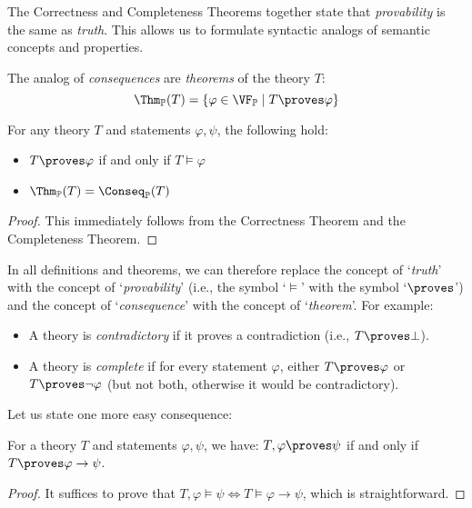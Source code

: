 The Correctness and Completeness Theorems together state that \emph{provability} is the same as \emph{truth}. This allows us to formulate syntactic analogs of semantic concepts and properties.

The analog of \emph{consequences} are \emph{theorems} of the theory $T$:
$$
\Thm_\mathbb{P}(T) = \{\varphi \in \VF_\mathbb{P} \mid T \proves \varphi\}
$$

\begin{corollary}[Provability = Truth]\label{corollary:corollary-of-soundness-and-completeness}
    For any theory $T$ and statements $\varphi, \psi$, the following hold:
    \begin{itemize}
        \item $T \proves \varphi$ if and only if $T \models \varphi$
        \item $\Thm_\mathbb{P}(T) = \Conseq_\mathbb{P}(T)$
    \end{itemize}
\end{corollary}
\begin{proof}
    This immediately follows from the Correctness Theorem and the Completeness Theorem.
\end{proof}

In all definitions and theorems, we can therefore replace the concept of `\emph{truth}' with the concept of `\emph{provability}' (i.e., the symbol `$\models$' with the symbol `$\proves$') and the concept of `\emph{consequence}' with the concept of `\emph{theorem}'. For example:
\begin{itemize}
    \item A theory is \emph{contradictory} if it proves a contradiction (i.e., $T \proves \bot$).
    \item A theory is \emph{complete} if for every statement $\varphi$, either $T \proves \varphi$ or $T \proves \neg \varphi$ (but not both, otherwise it would be contradictory).
\end{itemize}

Let us state one more easy consequence:

\begin{theorem}
For a theory $T$ and statements $\varphi, \psi$, we have:
$T, \varphi \proves \psi$ if and only if $T \proves \varphi \to \psi$.
\end{theorem}
\begin{proof}
    It suffices to prove that $T, \varphi \models \psi \Leftrightarrow T \models \varphi \to \psi$, which is straightforward.
\end{proof}

